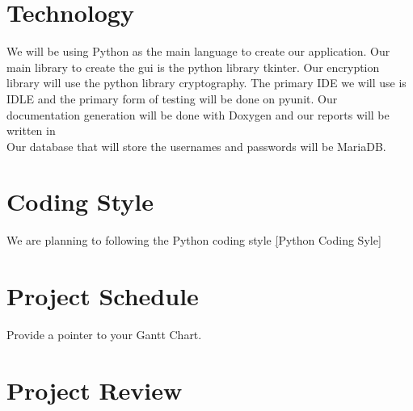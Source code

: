 \documentclass{article}
\begin{document}
\section{Technology}

We will be using Python as the main language to create our application. Our main library to create the gui is the python library tkinter. Our encryption library will use the python library cryptography. The primary IDE we will use is IDLE and the primary form of testing will be done on pyunit. Our documentation generation will be done with Doxygen and our reports will be written in \latex \\
Our database that will store the usernames and passwords will be MariaDB.

\section{Coding Style}

We are planning to following the Python coding style
\href{https://google.github.io/styleguide/pyguide.html}[Python Coding Syle]

\section{Project Schedule}

Provide a pointer to your Gantt Chart.

\section{Project Review}
\end{document}
